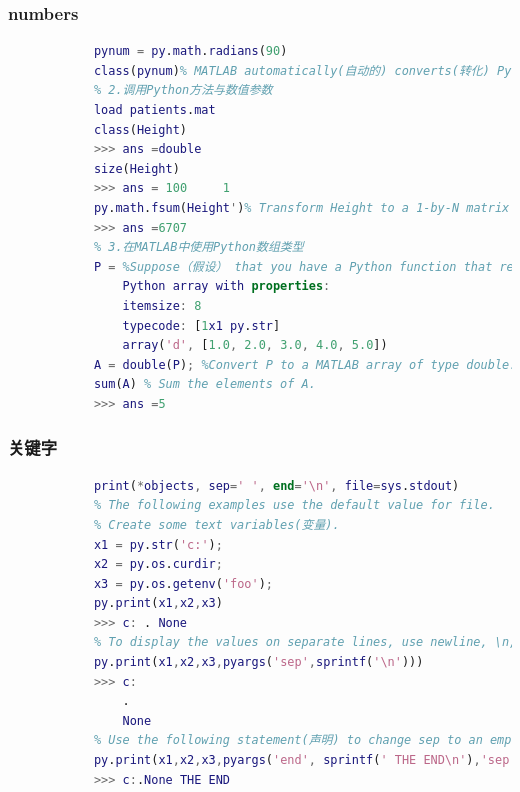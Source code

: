         \subsubsection{numbers}
            \par
            \begin{lstlisting}[language = Matlab]
            % 1.在MATLAB使用Python数值类型
            pynum = py.math.radians(90)
            class(pynum)% MATLAB automatically(自动的) converts(转化) Python float type to double.
            % 2.调用Python方法与数值参数
            load patients.mat
            class(Height)
            >>> ans =double
            size(Height)
            >>> ans = 100     1
            py.math.fsum(Height')% Transform Height to a 1-by-N matrix before calling fsum.
            >>> ans =6707
            % 3.在MATLAB中使用Python数组类型
            P = %Suppose（假设） that you have a Python function that returns the following array, P
                Python array with properties:
                itemsize: 8
                typecode: [1x1 py.str]
                array('d', [1.0, 2.0, 3.0, 4.0, 5.0])
            A = double(P); %Convert P to a MATLAB array of type double.
            sum(A) % Sum the elements of A.
            >>> ans =5
            \end{lstlisting}
        \subsubsection{关键字}
            \par
            \begin{lstlisting}[language = Matlab]
            %% The Python built-in print function has keyword arguments, sep, end, and file.
            print(*objects, sep=' ', end='\n', file=sys.stdout)
            % The following examples use the default value for file.
            % Create some text variables(变量).
            x1 = py.str('c:');
            x2 = py.os.curdir;
            x3 = py.os.getenv('foo');
            py.print(x1,x2,x3)
            >>> c: . None
            % To display the values on separate lines, use newline, \n, as a separator(分离器).
            py.print(x1,x2,x3,pyargs('sep',sprintf('\n')))
            >>> c:
                .
                None
            % Use the following statement(声明) to change sep to an empty string and change the end value to display THE END.
            py.print(x1,x2,x3,pyargs('end', sprintf(' THE END\n'),'sep',py.str))
            >>> c:.None THE END
            \end{lstlisting}
